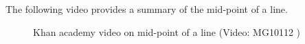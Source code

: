 



The following video provides a summary of the mid-point of a line.
\setcounter{subfigure}{0}
\begin{figure}[H] %
\textnormal{Khan academy video on mid-point of a line}\vspace{.1in} \nopagebreak
\label{m39119*yt-media2}\label{m39119*yt-video2}
 { (Video:  MG10112 )}
\vspace{2pt}
\vspace{.1in}
\end{figure}      
%     
%     
% 
